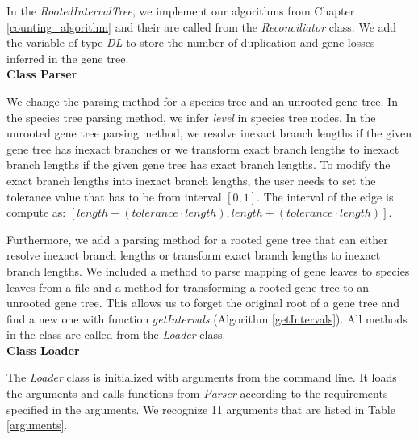 In the \emph{RootedIntervalTree}, we implement our algorithms from Chapter \ref{counting_algorithm} and their are called from the \emph{Reconciliator} class. We add the variable of type \emph{DL} to store the number of duplication and gene losses inferred in the gene tree.\\
\textbf{Class Parser}

We change the parsing method for a species tree and an unrooted gene tree. In the species tree parsing method, we infer \emph{level} in species tree nodes. In the unrooted gene tree parsing method, we resolve inexact branch lengths if the given gene tree has inexact branches or we transform exact branch lengths to inexact branch lengths if the given gene tree has exact branch lengths. To modify the exact branch lengths into inexact branch lengths, the user needs to set the tolerance value that has to be from interval $[ 0, 1 ]$. The interval of the edge is compute as: $[ length - (tolerance \cdot length), length + (tolerance \cdot length) ]$.

Furthermore, we add a parsing method for a rooted gene tree that can either resolve inexact branch lengths or transform exact branch lengths to inexact branch lengths. We included a method to parse mapping of gene leaves to species leaves from a file and a method for transforming a rooted gene tree to an unrooted gene tree. This allows us to forget the original root of a gene tree and find a new one with function \emph{getIntervals} (Algorithm \ref{getIntervals}). All methods in the class are called from the \emph{Loader} class.\\
\textbf{Class Loader}

The \emph{Loader} class is initialized with arguments from the command line. It loads the arguments and calls functions from \emph{Parser} according to the requirements specified in the arguments. We recognize 11 arguments that are listed in Table \ref{arguments}.

